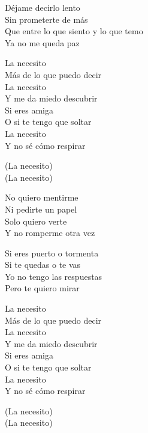 \begin{lyrics}
Déjame decirlo lento\\
Sin prometerte de más\\
Que entre lo que siento y lo que temo\\
Ya no me queda paz

La necesito\\
Más de lo que puedo decir\\
La necesito\\
Y me da miedo descubrir\\
Si eres amiga\\
O si te tengo que soltar\\
La necesito\\
Y no sé cómo respirar

(La necesito)\\
(La necesito)

No quiero mentirme\\
Ni pedirte un papel\\
Solo quiero verte\\
Y no romperme otra vez

Si eres puerto o tormenta\\
Si te quedas o te vas\\
Yo no tengo las respuestas\\
Pero te quiero mirar

La necesito\\
Más de lo que puedo decir\\
La necesito\\
Y me da miedo descubrir\\
Si eres amiga\\
O si te tengo que soltar\\
La necesito\\
Y no sé cómo respirar

(La necesito)\\
(La necesito)

\end{lyrics}

